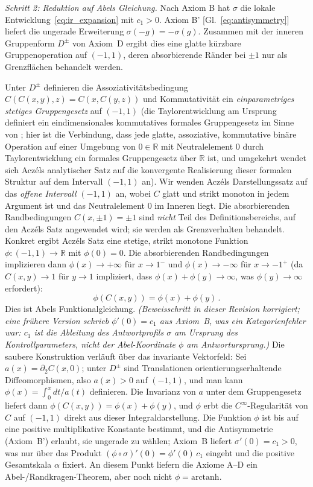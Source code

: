 \documentclass[aps,prd,twocolumn,superscriptaddress,nofootinbib]{revtex4-2}
\begin{document}
\textit{Schritt 2: Reduktion auf Abels Gleichung.}
Nach Axiom B hat $\sigma$ die lokale Entwicklung~\eqref{eq:ir_expansion} mit $c_1 > 0$. Axiom B' [Gl.~\eqref{eq:antisymmetry}] liefert die ungerade Erweiterung $\sigma(-g)=-\sigma(g)$. Zusammen mit der inneren Gruppenform $D^\pm$ von Axiom~D ergibt dies eine glatte kürzbare Gruppenoperation auf $(-1,1)$, deren absorbierende Ränder bei $\pm 1$ nur als Grenzflächen behandelt werden.

Unter $D^\pm$ definieren die Assoziativitätsbedingung $C(C(x,y),z) = C(x, C(y,z))$ und Kommutativität ein \textit{einparametriges stetiges Gruppengesetz} auf $(-1,1)$ (die Taylorentwicklung am Ursprung definiert ein eindimensionales kommutatives formales Gruppengesetz im Sinne von \cite{Hazewinkel1978}; hier ist die Verbindung, dass jede glatte, assoziative, kommutative binäre Operation auf einer Umgebung von $0 \in \mathbb{R}$ mit Neutralelement $0$ durch Taylorentwicklung ein formales Gruppengesetz über $\mathbb{R}$ ist, und umgekehrt wendet sich Aczéls analytischer Satz auf die konvergente Realisierung dieser formalen Struktur auf dem Intervall $(-1,1)$ an). Wir wenden Aczéls Darstellungssatz \cite{Aczel1966} auf das \textit{offene Intervall} $(-1,1)$ an, wobei $C$ glatt und strikt monoton in jedem Argument ist und das Neutralelement $0$ im Inneren liegt. Die absorbierenden Randbedingungen $C(x, \pm 1) = \pm 1$ sind \textit{nicht} Teil des Definitionsbereichs, auf den Aczéls Satz angewendet wird; sie werden als Grenzverhalten behandelt. Konkret ergibt Aczéls Satz eine stetige, strikt monotone Funktion $\phi: (-1,1) \to \mathbb{R}$ mit $\phi(0) = 0$. Die absorbierenden Randbedingungen implizieren dann $\phi(x) \to +\infty$ für $x \to 1^-$ und $\phi(x) \to -\infty$ für $x \to -1^+$ (da $C(x,y) \to 1$ für $y \to 1$ impliziert, dass $\phi(x) + \phi(y) \to \infty$, was $\phi(y) \to \infty$ erfordert):
\begin{equation}
\phi(C(x,y)) = \phi(x) + \phi(y)\,.
\label{eq:abel}
\end{equation}
Dies ist Abels Funktionalgleichung. \emph{(Beweisschritt in dieser Revision korrigiert; eine frühere Version schrieb $\phi'(0)=c_1$ aus Axiom~B, was ein Kategorienfehler war: $c_1$ ist die Ableitung des Antwortprofils $\sigma$ am Ursprung des Kontrollparameters, nicht der Abel-Koordinate $\phi$ am Antwortursprung.)} Die saubere Konstruktion verläuft über das invariante Vektorfeld: Sei $a(x) = \partial_2 C(x,0)$; unter $D^\pm$ sind Translationen orientierungserhaltende Diffeomorphismen, also $a(x) > 0$ auf $(-1,1)$, und man kann $\phi(x) = \int_0^x dt/a(t)$ definieren. Die Invarianz von $a$ unter dem Gruppengesetz liefert dann $\phi(C(x,y)) = \phi(x) + \phi(y)$, und $\phi$ erbt die $C^\infty$-Regularität von $C$ auf $(-1,1)$ direkt aus dieser Integraldarstellung. Die Funktion $\phi$ ist bis auf eine positive multiplikative Konstante bestimmt, und die Antisymmetrie (Axiom~B') erlaubt, sie ungerade zu wählen; Axiom~B liefert $\sigma'(0) = c_1 > 0$, was nur über das Produkt $(\phi\circ\sigma)'(0) = \phi'(0)\,c_1$ eingeht und die positive Gesamtskala $\alpha$ fixiert. An diesem Punkt liefern die Axiome A--D ein Abel-/Randkragen-Theorem, aber noch nicht $\phi=\mathrm{arctanh}$.
\end{document}
